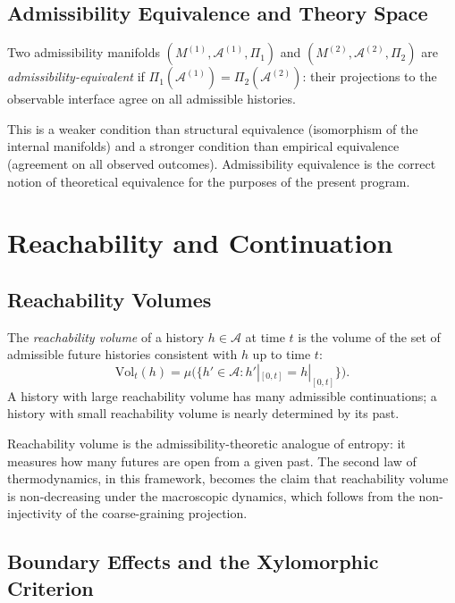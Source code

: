 \documentclass[12pt,a4paper]{book}
\theoremstyle{remark}
\theoremstyle{definition}
\begin{document}
\section{Admissibility Equivalence and Theory Space}

Two admissibility manifolds $(M^{(1)}, \mathcal{A}^{(1)}, \Pi_1)$ and
$(M^{(2)}, \mathcal{A}^{(2)}, \Pi_2)$ are \emph{admissibility-equivalent}
if $\Pi_1(\mathcal{A}^{(1)}) = \Pi_2(\mathcal{A}^{(2)})$: their
projections to the observable interface agree on all admissible histories.

This is a weaker condition than structural equivalence (isomorphism of
the internal manifolds) and a stronger condition than empirical equivalence
(agreement on all observed outcomes). Admissibility equivalence is the
correct notion of theoretical equivalence for the purposes of the present
program.

\chapter{Reachability and Continuation}

\section{Reachability Volumes}

The \emph{reachability volume} of a history $h \in \mathcal{A}$ at time
$t$ is the volume of the set of admissible future histories consistent
with $h$ up to time $t$:
\begin{equation}
  \mathrm{Vol}_t(h)
  = \mu\!\bigl(\{h' \in \mathcal{A} : h'|_{[0,t]} = h|_{[0,t]}\}\bigr).
\end{equation}
A history with large reachability volume has many admissible continuations;
a history with small reachability volume is nearly determined by its past.

Reachability volume is the admissibility-theoretic analogue of entropy:
it measures how many futures are open from a given past. The second law
of thermodynamics, in this framework, becomes the claim that reachability
volume is non-decreasing under the macroscopic dynamics, which follows
from the non-injectivity of the coarse-graining projection.

\section{Boundary Effects and the Xylomorphic Criterion}
\end{document}
